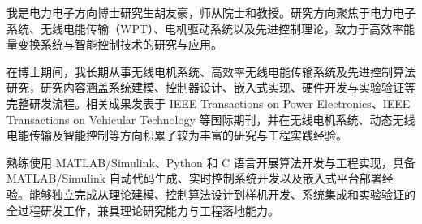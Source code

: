 

\begin{cvparagraph}


我是电力电子方向博士研究生胡友豪，师从院士和教授。研究方向聚焦于电力电子系统、无线电能传输（WPT）、电机驱动系统以及先进控制理论，致力于高效率能量变换系统与智能控制技术的研究与应用。

在博士期间，我长期从事无线电机系统、高效率无线电能传输系统及先进控制算法研究，研究内容涵盖系统建模、控制器设计、嵌入式实现、硬件开发与实验验证等完整研发流程。相关成果发表于 IEEE Transactions on Power Electronics、IEEE Transactions on Vehicular Technology 等国际期刊，并在无线电机系统、动态无线电能传输及智能控制等方向积累了较为丰富的研究与工程实践经验。

熟练使用 MATLAB/Simulink、Python 和 C 语言开展算法开发与工程实现，具备 MATLAB/Simulink 自动代码生成、实时控制系统开发以及嵌入式平台部署经验。能够独立完成从理论建模、控制算法设计到样机开发、系统集成和实验验证的全过程研发工作，兼具理论研究能力与工程落地能力。


\end{cvparagraph}
